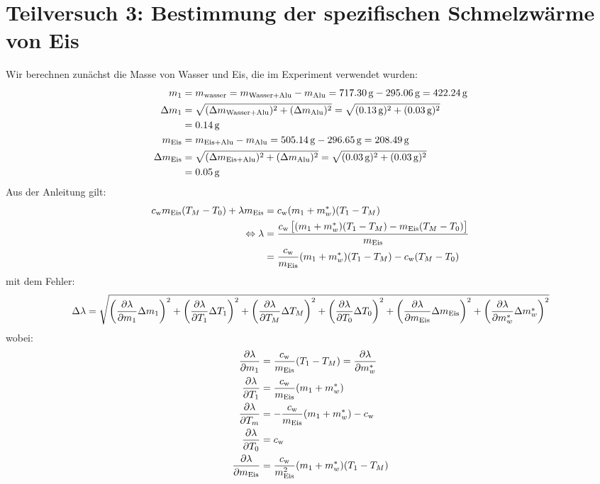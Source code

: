 \newpage
\section{Teilversuch 3: Bestimmung der spezifischen Schmelzwärme von Eis}
Wir berechnen zunächst die Masse von Wasser und Eis, die im Experiment verwendet wurden:
\begin{align}
	m_1 &= m_\text{wasser} = m_\text{Wasser+Alu} - m_\text{Alu} =\SI{717.30}{\gram} - \SI{295.06}{\gram} = \SI{422.24}{\gram} \\
	\Delta m_1 &= \sqrt{(\Delta m_\text{Wasser+Alu})^2 + (\Delta m_\text{Alu})^2} = \sqrt{(\SI{0.13}{\gram})^2 + (\SI{0.03}{\gram})^2} \notag \\
	&= \SI{0.14}{\gram} \\
	m_\text{Eis} &= m_\text{Eis+Alu} - m_\text{Alu} =\SI{505.14}{\gram} - \SI{296.65}{\gram} = \SI{208.49}{\gram} \\
	\Delta m_\text{Eis} &= \sqrt{(\Delta m_\text{Eis+Alu})^2 + (\Delta m_\text{Alu})^2} = \sqrt{(\SI{0.03}{\gram})^2 + (\SI{0.03}{\gram})^2} \notag \\
	&= \SI{0.05}{\gram} \\
\end{align}
Aus der Anleitung gilt:
\begin{align}
	c_\text{w} m_{\text{Eis}}(T_M-T_0) + \lambda m_{\text{Eis}} &= c_\text{w}(m_1 + m_w^*) (T_1 - T_M) \\
	\Leftrightarrow  \lambda &= \frac{c_\text{w} \left[(m_1 + m_w^*)(T_1 -T_M) - m_\text{Eis} (T_M -T_0)\right] }{m_\text{Eis}} \notag \\
	&=\frac{c_\text{w}}{m_\text{Eis}}(m_1 + m_w^*)(T_1 -T_M) - c_\text{w}(T_M -T_0)
\end{align}
mit dem Fehler:
\begin{align}
	\Delta \lambda = \gausserror{\lambda}{m_1, T_1, T_M, T_0, m_\text{Eis}, m_w^*}
\end{align}
wobei:
\begin{align*}
	\pdv{\lambda}{m_1} &= \frac{c_\text{w}}{m_\text{Eis}}(T_1 - T_M) = \pdv{\lambda}{m_w^*} \\
	\pdv{\lambda}{T_1} &= \frac{c_\text{w}}{m_\text{Eis}}(m_1 + m_w^*) \\
	\pdv{\lambda}{T_m} &= -\frac{c_\text{w}}{m_\text{Eis}}(m_1 + m_w^*) - c_\text{w} \\
	\pdv{\lambda}{T_0} &= c_\text{w} \\
	\pdv{\lambda}{m_\text{Eis}} &= \frac{c_\text{w}}{m^2_\text{Eis}}(m_1 + m_w^*)(T_1 -T_M)
\end{align*}
